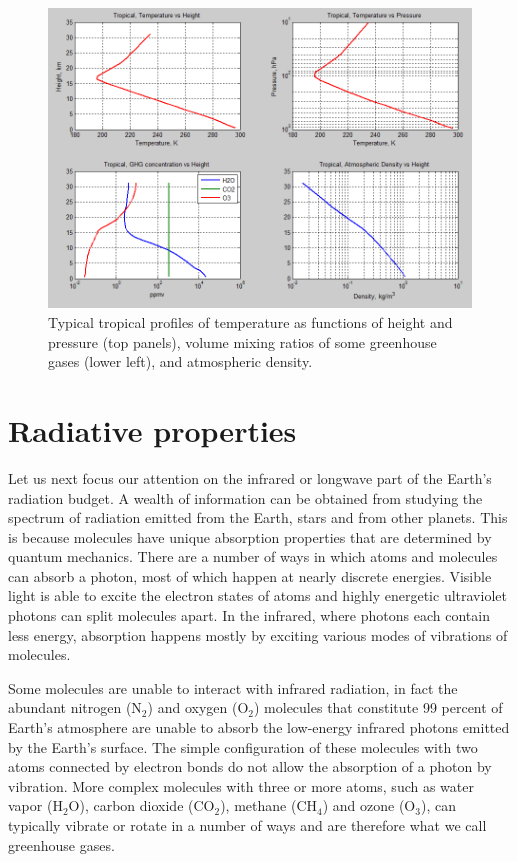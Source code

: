 \documentclass[12pt]{book}
\begin{document}
\begin{figure}
\begin{center}
\includegraphics[width=17 cm]{../external_figures/atmospheric-radiation-13a-tropical-profile-temperature-gases-density}
\end{center}
\caption{ Typical tropical profiles of temperature as functions of height and pressure (top panels), volume mixing ratios of some greenhouse gases (lower left), and atmospheric density.  } 
\label{fig:tropical_profiles}
\end{figure}

\section{Radiative properties}
Let us next focus our attention on the infrared or longwave part of the Earth's radiation budget. A wealth of information can be obtained from studying the spectrum of radiation emitted from the Earth, stars and from other planets. This is because molecules have unique absorption properties that are determined by quantum mechanics. There are a number of ways in which atoms and molecules can absorb a photon, most of which happen at nearly discrete energies. Visible light is able to excite the electron states of atoms and highly energetic ultraviolet photons can split molecules apart. In the infrared, where photons each contain less energy, absorption happens mostly by exciting various modes of vibrations of molecules. 

Some molecules are unable to interact with infrared radiation, in fact the abundant nitrogen (N$_2$) and oxygen (O$_2$) molecules that constitute 99 percent of Earth's atmosphere are unable to absorb the low-energy infrared photons emitted by the Earth's surface. The simple configuration of these molecules with two atoms connected by electron bonds do not allow the absorption of a photon by vibration. More complex molecules with three or more atoms, such as water vapor (H$_2$O), carbon dioxide (CO$_2$), methane (CH$_4$) and ozone (O$_3$), can typically vibrate or rotate in a number of ways and are therefore what we call greenhouse gases. 
\end{document}
